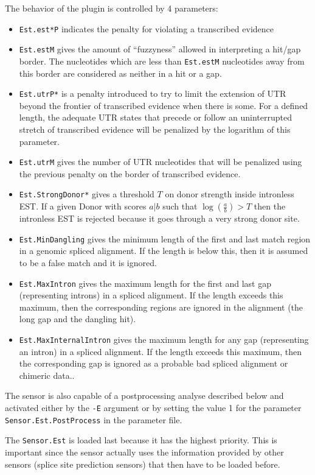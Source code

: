 The behavior of the plugin is controlled by 4 parameters:
\begin{itemize}
\item \texttt{Est.est*P} indicates the penalty for violating a transcribed
  evidence
\item \texttt{Est.estM} gives the amount of ``fuzzyness'' allowed in
  interpreting a hit/gap border. The nucleotides which are less than
  \texttt{Est.estM} nucleotides away from this border are considered
  as neither in a hit or a gap.
\item \texttt{Est.utrP*} is a penalty introduced to try to limit the
  extension of UTR beyond the frontier of transcribed evidence when
  there is some. For a defined length, the adequate UTR states that
  precede or follow an uninterrupted stretch of transcribed evidence
  will be penalized by the logarithm of this parameter.
\item \texttt{Est.utrM} gives the number of UTR nucleotides that will
  be penalized using the previous penalty on the border of transcribed
  evidence.
\item \texttt{Est.StrongDonor*} gives a threshold $T$ on donor strength
  inside intronless EST. If a given Donor with scores $a|b$ such that
  $\log(\frac{a}{b}) >T$ then the intronless EST is rejected because
  it goes through a very strong donor site.
\item \texttt{Est.MinDangling} gives the minimum length of the first
  and last match region in a genomic spliced alignment. If the length
  is below this, then it is assumed to be a false match and it is
  ignored.
\item \texttt{Est.MaxIntron} gives the maximum length for the first
  and last gap (representing introns) in a spliced alignment. If the
  length exceeds this maximum, then the corresponding regions are
  ignored in the alignment (the long gap and the dangling hit).
\item \texttt{Est.MaxInternalIntron} gives the maximum length for any
  gap (representing an intron) in a spliced alignment. If the length
  exceeds this maximum, then the corresponding gap is ignored as
  a probable bad spliced alignment or chimeric data..
\end{itemize}

The sensor is also capable of a postprocessing analyse described below
and activated either by the \texttt{-E} argument or by setting the value
1 for the parameter \texttt{Sensor.Est.PostProcess} in the parameter
file.

The \texttt{Sensor.Est} is loaded last because it has the highest priority.
This is important since the sensor actually uses the information
provided by other sensors (splice site prediction sensors) that then have to be loaded before.

